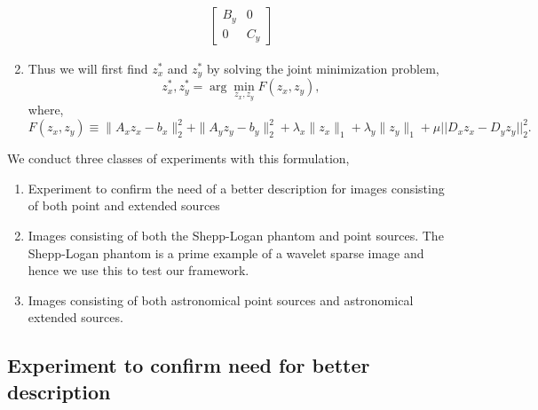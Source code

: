 \begin{enumerate}
\begin{align}
\begin{bmatrix}
B_y &  0 \\
0 & C_y
\end{bmatrix}
\end{align}
\item Thus we will first find $z_x^*$ and $z_y^*$ by solving the joint minimization problem,
 \begin{equation}
 z_x^*, z_y^* = \arg \min_{z_x, z_y} F(z_x, z_y),
 \end{equation}
where,
 \begin{equation}
 F(z_x, z_y) \equiv \|A_x z_x - b_x\|_2^2 + \|A_y z_y - b_y\|_2^2 + \lambda_x \|z_x\|_1 + \lambda_y \|z_y\|_1 + \mu ||D_x z_x - D_y z_y||_2^2.
 \end{equation}
\end{enumerate}
We conduct three classes of experiments with this formulation,
\begin{enumerate}
\item Experiment to confirm the need of a better description for images consisting of both point and extended sources
\item Images consisting of both the Shepp-Logan phantom and point sources. The Shepp-Logan phantom is a prime example of a wavelet sparse image and hence we use this to test our framework.
\item Images consisting of both astronomical point sources and astronomical extended sources.
\end{enumerate}

\subsection{Experiment to confirm need for better description}


